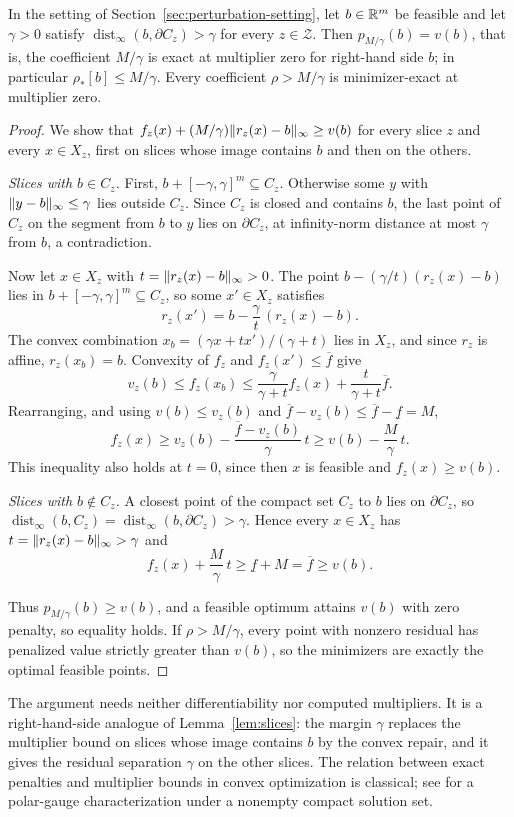 \begin{lemma}\label{lem:rhsmargin}
In the setting of Section~\ref{sec:perturbation-setting}, let $b\in\mathbb R^m$
be feasible and let $\gamma>0$ satisfy
$\operatorname{dist}_\infty(b,\partial C_z)>\gamma$ for every
$z\in\mathcal Z$. Then $p_{M/\gamma}(b)=v(b)$, that is, the coefficient
$M/\gamma$ is exact at multiplier zero for right-hand side $b$; in
particular $\rho_*[b]\le M/\gamma$. Every coefficient $\rho>M/\gamma$ is
minimizer-exact at multiplier zero.
\end{lemma}
\begin{proof}
We show that $f_z(x)+(M/\gamma)\lVert r_z(x)-b\rVert_\infty\ge v(b)$ for every
slice $z$ and every $x\in X_z$, first on slices whose image contains $b$
and then on the others.

\emph{Slices with $b\in C_z$.} First, $b+[-\gamma,\gamma]^m\subseteq C_z$.
Otherwise some $y$ with $\lVert y-b\rVert_\infty\le\gamma$ lies outside $C_z$.
Since $C_z$ is closed and contains $b$, the last point of $C_z$ on the
segment from $b$ to $y$ lies on $\partial C_z$, at infinity-norm distance
at most $\gamma$ from $b$, a contradiction.

Now let $x\in X_z$ with $t=\lVert r_z(x)-b\rVert_\infty>0$. The point
$b-(\gamma/t)(r_z(x)-b)$ lies in $b+[-\gamma,\gamma]^m\subseteq C_z$, so
some $x'\in X_z$ satisfies
\[
 r_z(x')=b-\frac\gamma t\,(r_z(x)-b).
\]
The convex combination $x_b=(\gamma x+tx')/(\gamma+t)$ lies in $X_z$, and
since $r_z$ is affine, $r_z(x_b)=b$. Convexity of $f_z$ and
$f_z(x')\le\overline f$ give
\[
 v_z(b)\le f_z(x_b)\le\frac\gamma{\gamma+t}f_z(x)
                    +\frac t{\gamma+t}\overline f .
\]
Rearranging, and using $v(b)\le v_z(b)$ and
$\overline f-v_z(b)\le\overline f-\underline f=M$,
\[
 f_z(x)\ge v_z(b)-\frac{\overline f-v_z(b)}{\gamma}\,t
       \ge v(b)-\frac M\gamma\,t .
\]
This inequality also holds at $t=0$, since then $x$ is feasible and
$f_z(x)\ge v(b)$.

\emph{Slices with $b\notin C_z$.} A closest point of the compact set
$C_z$ to $b$ lies on $\partial C_z$, so
$\operatorname{dist}_\infty(b,C_z)=\operatorname{dist}_\infty(b,\partial C_z)>\gamma$.
Hence every $x\in X_z$ has $t=\lVert r_z(x)-b\rVert_\infty>\gamma$ and
\[
 f_z(x)+\frac M\gamma\,t\ge\underline f+M=\overline f\ge v(b).
\]

Thus $p_{M/\gamma}(b)\ge v(b)$, and a feasible optimum attains $v(b)$
with zero penalty, so equality holds. If $\rho>M/\gamma$, every point
with nonzero residual has penalized value strictly greater than $v(b)$,
so the minimizers are exactly the optimal feasible points.
\end{proof}
The argument needs neither differentiability nor computed multipliers.
It is a right-hand-side analogue of Lemma~\ref{lem:slices}: the margin
$\gamma$ replaces the multiplier bound on slices whose image contains
$b$ by the convex repair, and it gives the residual separation $\gamma$
on the other slices. The relation between exact penalties and multiplier bounds in
convex optimization is classical; see
\citet[Theorem~4.2]{FriedlanderTseng2007} for a polar-gauge
characterization under a nonempty compact solution set.

